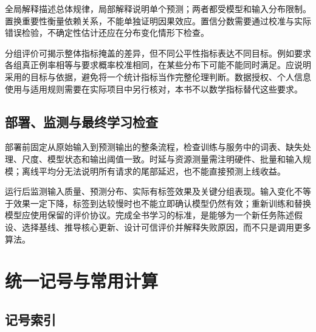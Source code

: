 \documentclass[UTF8,12pt,a4paper,fontset=fandol]{ctexbook}
\begin{document}
全局解释描述总体规律，局部解释说明单个预测；两者都受模型和输入分布限制。置换重要性衡量依赖关系，不能单独证明因果效应。置信分数需要通过校准与实际错误检验，不确定性估计还应在分布变化情形下检查。

分组评价可揭示整体指标掩盖的差异，但不同公平性指标表达不同目标。例如要求各组真正例率相等与要求概率校准相同，在某些分布下可能不能同时满足。应说明采用的目标与依据，避免将一个统计指标当作完整伦理判断。数据授权、个人信息使用与适用规则需要在实际项目中另行核对，本书不以数学指标替代这些要求。

\section{部署、监测与最终学习检查}

部署前固定从原始输入到预测输出的整条流程，检查训练与服务中的词表、缺失处理、尺度、模型状态和输出阈值一致。时延与资源测量需注明硬件、批量和输入规模；离线平均分无法说明所有请求的尾部延迟，也不能直接预测上线收益。

运行后监测输入质量、预测分布、实际有标签效果及关键分组表现。输入变化不等于效果一定下降，标签到达较慢时也不能立即确认模型仍然有效；重新训练和替换模型应使用保留的评价协议。完成全书学习的标准，是能够为一个新任务陈述假设、选择基线、推导核心更新、设计可信评价并解释失败原因，而不只是调用更多算法。

\appendix

\chapter{统一记号与常用计算}
\label{app:ml-notation}

\section{记号索引}
\end{document}
